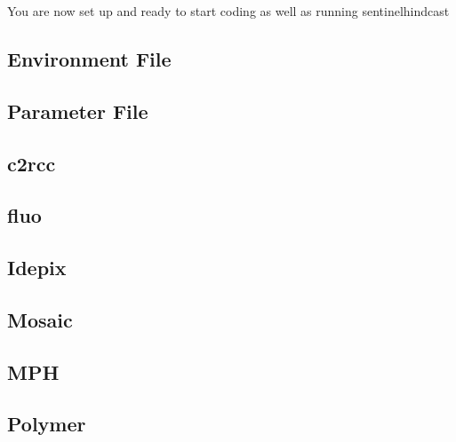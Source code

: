 \documentclass[letterpaper,10pt,english]{sphinxmanual}
\begin{document}
You are now set up and ready to start coding as well as running sentinel\sphinxhyphen{}hindcast


\subsection{Environment File}
\label{\detokenize{environment_config:environment-file}}\label{\detokenize{environment_config:environments}}\label{\detokenize{environment_config::doc}}

\subsection{Parameter File}
\label{\detokenize{parameters_config:parameter-file}}\label{\detokenize{parameters_config:parameters}}\label{\detokenize{parameters_config::doc}}

\subsection{c2rcc}
\label{\detokenize{c2rcc:c2rcc}}\label{\detokenize{c2rcc::doc}}

\subsection{fluo}
\label{\detokenize{fluo:fluo}}\label{\detokenize{fluo::doc}}

\subsection{Idepix}
\label{\detokenize{idepix:idepix}}\label{\detokenize{idepix::doc}}

\subsection{Mosaic}
\label{\detokenize{mosaic:mosaic}}\label{\detokenize{mosaic::doc}}

\subsection{MPH}
\label{\detokenize{mph:mph}}\label{\detokenize{mph::doc}}

\subsection{Polymer}
\label{\detokenize{polymer:polymer}}\label{\detokenize{polymer::doc}}
\end{document}
